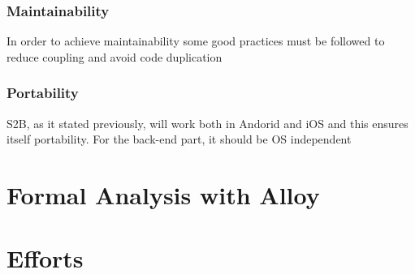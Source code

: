 \documentclass{article}
\begin{document}
\subsubsection{Maintainability}
In order to achieve maintainability some good practices must be followed to reduce coupling and avoid code duplication 
\subsubsection{Portability}
S2B, as it stated previously, will work both in Andorid and iOS and this ensures itself portability. For 
the back-end part, it should be OS independent





\section{Formal Analysis with Alloy}

\section{Efforts}
\end{document}

